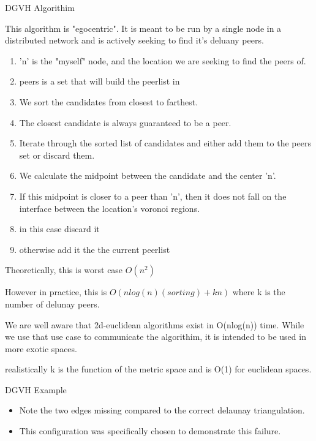 \documentclass[8pt]{beamer}
\begin{document}
	
	\begin{frame}{DGVH Algorithim}

This algorithm is "egocentric". It is meant to be run by a single node in a distributed network and is actively seeking to find it's deluany peers.
\begin{enumerate}
\item 'n' is the "myself" node, and the location we are seeking to find the peers of.

\item  peers is a set that will build the peerlist in

\item We sort the candidates from closest to farthest.

\item The closest candidate is always guaranteed to be a peer.

\item Iterate through the sorted list of candidates and either add them to the peers set or discard them.

\item We calculate the midpoint between the candidate and the center 'n'. 

\item If this midpoint is closer to a peer than 'n', then it does not fall on the interface between the location's voronoi regions.

\item in this case discard it

\item otherwise add it the the current peerlist
\end{enumerate}
Theoretically, this is worst case $O(n^2)$

However in practice, this is $O(nlog(n) (sorting) + kn)$
where k is the number of delunay peers.

We are well aware that 2d-euclidean algorithms exist in O(nlog(n)) time. While we use that use case to communicate the algorithim, it is intended to be used in more exotic spaces. 

realistically k is the function of the metric space and is O(1) for euclidean spaces.

	\end{frame}
	
	
	
\begin{frame}{DGVH Example}
		\begin{itemize}
			\item Note the two edges missing compared to the correct delaunay triangulation.
			\item This configuration was specifically chosen to demonstrate this failure.
		\end{itemize}	
	\end{frame}
	
\end{document}
